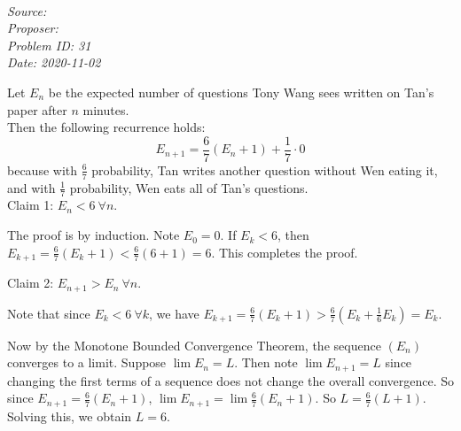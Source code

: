 \SSbreak\\ 
\emph{Source: \Cop}\\
\emph{Proposer: \Pbfan}\\
\emph{Problem ID: 31}\\
\emph{Date: 2020-11-02}\\
\SSbreak

\bigskip 

\begin{solution}\hfil\medskip

    Let $E_n$ be the expected number of questions Tony Wang sees written on Tan's paper after $n$ minutes. \\

    Then the following recurrence holds: 
    \[E_{n+1} = \frac{6}{7} (E_n+1) + \frac{1}{7} \cdot 0\]
    because with $\frac{6}{7}$ probability, Tan writes another question without Wen eating it, 
    and with $\frac{1}{7}$ probability, Wen eats all of Tan's questions. \\

    Claim 1: $E_n < 6 ~\forall n$. 

    \begin{subproof}
        The proof is by induction. Note $E_0 = 0$. If $E_k < 6$, then 
        $E_{k+1} = \frac{6}{7} (E_k + 1) < \frac{6}{7} (6 + 1) = 6$. 
        This completes the proof. 
    \end{subproof}

    Claim 2: $E_{n+1} > E_n ~\forall n$. 

    \begin{subproof}
        Note that since $E_k < 6 ~\forall k$, we have 
        $E_{k+1} = \frac{6}{7} (E_k+1) > \frac{6}{7} (E_k + \frac16 E_k) = E_k$. 
    \end{subproof}

    Now by the Monotone Bounded Convergence Theorem, the sequence $\left( E_n \right )$ converges to a limit. 
    Suppose $\lim E_n = L$. Then note $\lim E_{n+1} = L$ since changing the first terms of a sequence does not change the overall convergence. 
    So since $E_{n+1} = \frac{6}{7} (E_n + 1)$, $\lim E_{n+1} = \lim \frac{6}{7} (E_n+1)$. 
    So $L = \frac{6}{7}(L + 1)$. \\

    Solving this, we obtain $L = \boxed{6}$. 
\end{solution}\bigskip